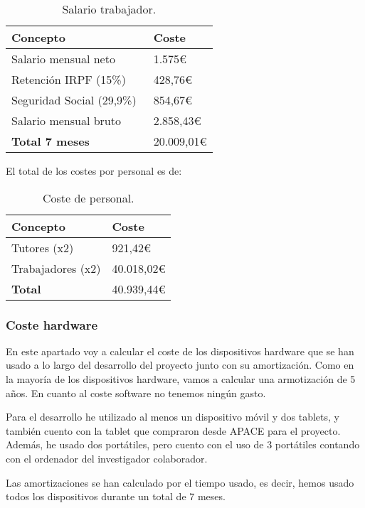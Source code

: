 \begin{table}[H]
	\centering
	\begin{tabular}{ll}
		\toprule
		\textbf{Concepto}         & \textbf{Coste}                \\
		\midrule
		Salario mensual neto      & 1.575\euro     \\
		Retención IRPF (15\%)     & 428,76\euro   \\
		Seguridad Social (29,9\%)~\cite{gobees} & 854,67\euro   \\
		Salario mensual bruto     & 2.858,43\euro  \\
		\midrule
		\textbf{Total 7 meses}    & 20.009,01\euro \\		
		\bottomrule
	\end{tabular}
	\caption{Salario trabajador.}
\end{table}

El total de los costes por personal es de:
\begin{table}[H]
	\centering
	\begin{tabular}{ll}
		\toprule
		\textbf{Concepto} & \textbf{Coste} \\ \midrule
		Tutores (x2)      & 921,42\euro   \\
		Trabajadores (x2) & 40.018,02\euro   \\ \midrule
		\textbf{Total}    & 40.939,44\euro   \\ \bottomrule
	\end{tabular}
	\caption{Coste de personal.}
\end{table}

\subsubsection{Coste hardware}
En este apartado voy a calcular el coste de los dispositivos hardware que se han usado a lo largo del desarrollo del proyecto junto con su amortización. Como en la mayoría de los dispositivos hardware, vamos a calcular una armotización de 5 años. En cuanto al coste software no tenemos ningún gasto.

Para el desarrollo he utilizado al menos un dispositivo móvil y dos tablets, y también cuento con la tablet que compraron desde APACE para el proyecto. Además, he usado dos portátiles, pero cuento con el uso de 3 portátiles contando con el ordenador del investigador colaborador.

Las amortizaciones se han calculado por el tiempo usado, es decir, hemos usado todos los dispositivos durante un total de 7 meses.

